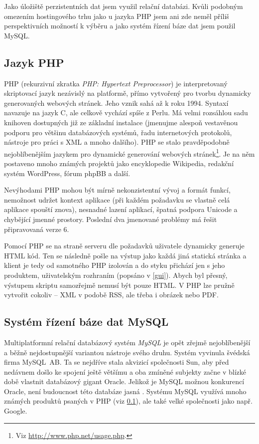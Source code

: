 Jako úložiště perzistentních dat jsem využil relační databázi. Kvůli
podobným omezením hostingového trhu jako u jazyka PHP jsem ani zde
neměl příliš perspektivních možností k výběru a jako systém
řízení báze dat jsem použil MySQL.

\subsection{Jazyk PHP}\label{php}
PHP (rekurzivní zkratka {\it PHP: Hypertext Preprocessor}) je
interpretovaný skriptovací jazyk nezávislý na platformě, přímo
vytvořený pro tvorbu dynamicky generovaných webových stránek. Jeho
vznik sahá až k roku 1994. Syntaxí navazuje na jazyk C, ale celkově
vychází spíše z Perlu. Má velmi rozsáhlou sadu knihoven dostupných
již ze základní instalace (jmenujme alespoň vestavěnou podporu pro
většinu databázových systémů, řadu internetových protokolů, nástroje
pro práci s XML a mnoho dalšího). PHP se stalo pravděpodobně
nejoblíbenějším jazykem pro dynamické generování webových
stránek\footnote{Viz \url{http://www.php.net/usage.php}.}. Je na něm
postaveno mnoho známých projektů jako encyklopedie Wikipedia,
redakční systém WordPress, fórum phpBB a další. \cite{phpBook}

Nevýhodami PHP mohou být mírně nekonzistentní vývoj a formát funkcí,
nemožnost udržet kontext aplikace (při každém požadavku se vlastně
celá aplikace spouští znova), nesnadné lazení aplikací, špatná
podpora Unicode a chybějící jmenné prostory. Poslední dva jmenované
problémy má řešit připravovaná verze 6.

Pomocí PHP se na straně serveru dle požadavků
uživatele dynamicky generuje HTML kód. Ten se následně pošle na
výstup jako každá jiná statická stránka a klient je tedy od
samotného PHP izolován a do styku přichází jen s jeho produktem,
uživatelským rozhraním (popsáno v \ref{gui}). Abych byl přesný,
výstupem skriptu samozřejmě nemusí být pouze HTML. V PHP lze
pružně vytvořit cokoliv -- XML v podobě RSS, ale třeba i
obrázek nebo PDF.

\subsection{Systém řízení báze dat MySQL}\label{mysql}
Multiplatformní relační databázový systém {\it MySQL} je opět zřejmě
nejoblíbenější a běžně nejdostupnější variantou nástroje svého druhu. Systém
vyvinula švédská firma MySQL~AB. Ta se nejdříve stala
akvizicí společnosti Sun, aby před nedávnem došlo ke spojení ještě
většímu a oba zmíněné subjekty začne v blízké době vlastnit databázový
gigant Oracle. Jelikož je MySQL možnou konkurencí Oracle, není budoucnost
této databáze jasná \cite{mysql}. Systému MySQL využívá mnoho známých produktů psaných v PHP (viz
\ref{php}), ale také velké společnosti jako např. Google.

